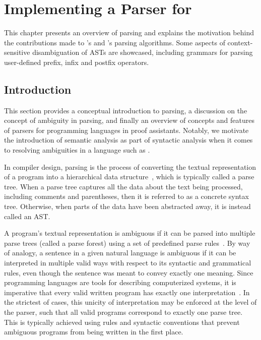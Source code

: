 \chapter{Implementing a Parser for \Beluga}

This chapter presents an overview of parsing and explains the motivation behind the contributions made to \Beluga's and \Harpoon's parsing algorithms.
Some aspects of context-sensitive disambiguation of \acp{AST} are showcased, including grammars for parsing user-defined prefix, infix and postfix operators.

\section{Introduction}

This section provides a conceptual introduction to parsing, a discussion on the concept of ambiguity in parsing, and finally an overview of concepts and features of parsers for programming languages in proof assistants.
Notably, we motivate the introduction of semantic analysis as part of syntactic analysis when it comes to resolving ambiguities in a language such as \Beluga.


In compiler design, parsing is the process of converting the textual representation of a program into a hierarchical data structure~\cite{aho2007compilers, afroozeh2019practical}, which is typically called a parse tree.
When a parse tree captures all the data about the text being processed, including comments and parentheses, then it is referred to as a concrete syntax tree.
Otherwise, when parts of the data have been abstracted away, it is instead called an \ac{AST}.


A program's textual representation is ambiguous if it can be parsed into multiple parse trees (called a parse forest) using a set of predefined parse rules~\cite{aho2007compilers}.
By way of analogy, a sentence in a given natural language is ambiguous if it can be interpreted in multiple valid ways with respect to its syntactic and grammatical rules, even though the sentence was meant to convey exactly one meaning.
Since programming languages are tools for describing computerized systems, it is imperative that every valid written program has exactly one interpretation~\cite{aho2007compilers}.
In the strictest of cases, this unicity of interpretation may be enforced at the level of the parser, such that all valid programs correspond to exactly one parse tree.
This is typically achieved using rules and syntactic conventions that prevent ambiguous programs from being written in the first place.

